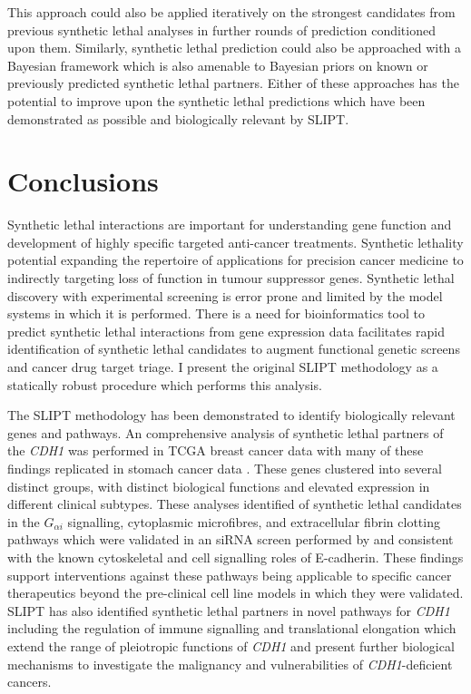 This approach could also be applied iteratively on the strongest candidates from previous synthetic lethal analyses in further rounds of prediction conditioned upon them. Similarly, synthetic lethal prediction could also be approached with a Bayesian framework which is also amenable to Bayesian priors on known or previously predicted synthetic lethal partners. Either of these approaches has the potential to improve upon the synthetic lethal predictions which have been demonstrated as possible and biologically relevant by \gls{SLIPT}. 


\clearpage
\section{Conclusions}
\label{chap:conclusion}

Synthetic lethal interactions are important for understanding gene function and development of highly specific targeted anti-cancer treatments. Synthetic lethality potential expanding the repertoire of applications for precision cancer medicine to indirectly targeting loss of function in tumour suppressor genes.  Synthetic lethal discovery with experimental screening is error prone and limited by the model systems in which it is performed.  There is a need for bioinformatics tool to predict synthetic lethal interactions from gene expression data facilitates rapid identification of synthetic lethal candidates to augment functional genetic screens and cancer drug target triage. I present the original \acrfull{SLIPT} methodology as a statically robust procedure which performs this analysis.

The \gls{SLIPT} methodology has been demonstrated to identify biologically relevant genes and pathways. An comprehensive analysis of synthetic lethal partners of the \textit{CDH1} was performed in \gls{TCGA} breast cancer data \citep{TCGA2012} with many of these findings replicated in stomach cancer data \citep{TCGA2014GC}. These genes clustered into several distinct groups, with distinct biological functions and elevated expression in different clinical subtypes.  These analyses identified of synthetic lethal candidates in the $G_{\alpha i}$ signalling, cytoplasmic microfibres, and extracellular fibrin clotting pathways which were validated in an \gls{siRNA} screen performed by \citet{Telford2015} and consistent with the known cytoskeletal and cell signalling roles of E-cadherin. These findings support interventions against these pathways being applicable to specific cancer therapeutics beyond the pre-clinical cell line models in which they were validated. \gls{SLIPT} has also identified synthetic lethal partners in novel pathways for \textit{CDH1} including the regulation of immune signalling and translational elongation which extend the range of pleiotropic functions of \textit{CDH1} and present further biological mechanisms to investigate the malignancy and vulnerabilities of \textit{CDH1}-deficient cancers.

